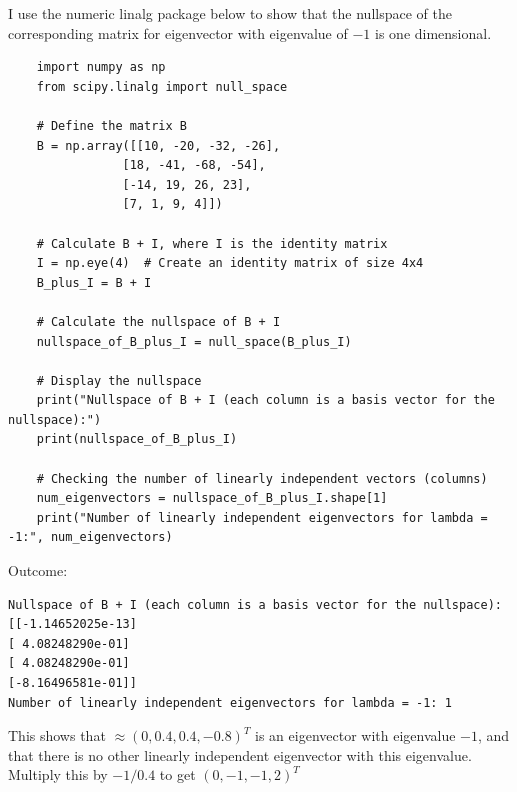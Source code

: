 \documentclass{article}
\begin{document}
I use the numeric linalg package below to show
that the nullspace of the corresponding matrix for
eigenvector with eigenvalue of $-1$ is one dimensional.
\begin{lstlisting}
    import numpy as np
    from scipy.linalg import null_space

    # Define the matrix B
    B = np.array([[10, -20, -32, -26],
                [18, -41, -68, -54],
                [-14, 19, 26, 23],
                [7, 1, 9, 4]])

    # Calculate B + I, where I is the identity matrix
    I = np.eye(4)  # Create an identity matrix of size 4x4
    B_plus_I = B + I

    # Calculate the nullspace of B + I
    nullspace_of_B_plus_I = null_space(B_plus_I)

    # Display the nullspace
    print("Nullspace of B + I (each column is a basis vector for the nullspace):")
    print(nullspace_of_B_plus_I)

    # Checking the number of linearly independent vectors (columns)
    num_eigenvectors = nullspace_of_B_plus_I.shape[1]
    print("Number of linearly independent eigenvectors for lambda = -1:", num_eigenvectors)

\end{lstlisting}

Outcome:
\begin{verbatim}
Nullspace of B + I (each column is a basis vector for the nullspace):
[[-1.14652025e-13]
[ 4.08248290e-01]
[ 4.08248290e-01]
[-8.16496581e-01]]
Number of linearly independent eigenvectors for lambda = -1: 1
\end{verbatim}

This shows that $\approx (0,0.4,0.4,-0.8)^T$ is an eigenvector with eigenvalue $-1$,
and that there is no other linearly independent eigenvector with this eigenvalue.
Multiply this by $-1/0.4$ to get $(0,-1,-1,2)^T$
\end{document}
